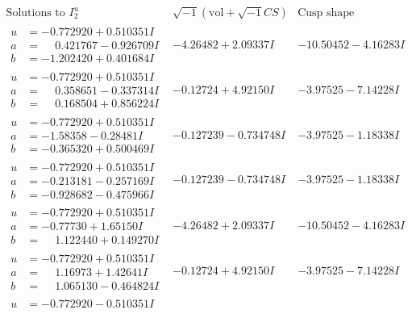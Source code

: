 \documentclass[1p]{elsarticle_modified}
\theoremstyle{definition}
\newcommand{\I}{\sqrt{-1}}
\begin{document}
$$\begin{array}{c|c|c}  
\text{Solutions to }I^u_{2}& \I (\text{vol} + \sqrt{-1}CS) & \text{Cusp shape}\\
 \hline 
\begin{aligned}
u &= -0.772920 + 0.510351 I \\
a &= \phantom{-}0.421767 - 0.926709 I \\
b &= -1.202420 + 0.401684 I\end{aligned}
 & -4.26482 + 2.09337 I & -10.50452 - 4.16283 I \\ \hline\begin{aligned}
u &= -0.772920 + 0.510351 I \\
a &= \phantom{-}0.358651 - 0.337314 I \\
b &= \phantom{-}0.168504 + 0.856224 I\end{aligned}
 & -0.12724 + 4.92150 I & -3.97525 - 7.14228 I \\ \hline\begin{aligned}
u &= -0.772920 + 0.510351 I \\
a &= -1.58358 - 0.28481 I \\
b &= -0.365320 + 0.500469 I\end{aligned}
 & -0.127239 - 0.734748 I & -3.97525 - 1.18338 I \\ \hline\begin{aligned}
u &= -0.772920 + 0.510351 I \\
a &= -0.213181 - 0.257169 I \\
b &= -0.928682 - 0.475966 I\end{aligned}
 & -0.127239 - 0.734748 I & -3.97525 - 1.18338 I \\ \hline\begin{aligned}
u &= -0.772920 + 0.510351 I \\
a &= -0.77730 + 1.65150 I \\
b &= \phantom{-}1.122440 + 0.149270 I\end{aligned}
 & -4.26482 + 2.09337 I & -10.50452 - 4.16283 I \\ \hline\begin{aligned}
u &= -0.772920 + 0.510351 I \\
a &= \phantom{-}1.16973 + 1.42641 I \\
b &= \phantom{-}1.065130 - 0.464824 I\end{aligned}
 & -0.12724 + 4.92150 I & -3.97525 - 7.14228 I \\ \hline\begin{aligned}
u &= -0.772920 - 0.510351 I \\

\end{aligned}
\end{array}$$
\end{document}
